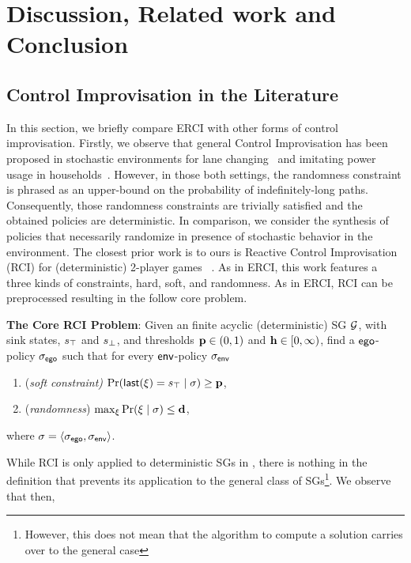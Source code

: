 \section{Discussion, Related work and Conclusion}

\subsection{Control Improvisation in the Literature}

In this section, we briefly compare ERCI with other forms of control
improvisation. Firstly, we observe that general Control Improvisation
has been proposed in stochastic environments for lane
changing~\cite{DBLP:conf/cdc/GeM18} and imitating power usage in
households~\cite{DBLP:conf/iotdi/AkkayaFVDLS16}. However, in those
both settings, the randomness constraint is phrased as an upper-bound
on the probability of indefinitely-long paths. Consequently, those
randomness constraints are trivially satisfied and the obtained
policies are deterministic.  In comparison, we consider the synthesis
of policies that necessarily randomize in presence of stochastic
behavior in the environment. The closest prior work is to ours
is Reactive Control Improvisation (RCI) for (deterministic) 2-player games
~\cite{DBLP:conf/cav/FremontS18}. As in ERCI, this work features
a three kinds of constraints, hard, soft, and randomness. As in ERCI,
RCI can be preprocessed resulting in the follow core problem.
\begin{mdframed}
  \textbf{The Core RCI Problem}: Given an finite acyclic
  (deterministic) SG $\mathcal{G}$, with sink states, $s_{\top}$ and $s_{\bot}$,
  and thresholds $\mathbf{p} \in (0,1)$ and
  $\mathbf{h} \in [0,\infty)$, find a $\mathsf{ego}$-policy ${\sigma_{\mathsf{ego}}}$
  such that for every $\mathsf{env}$-policy ${\sigma_{\mathsf{env}}}$
  \begin{enumerate}
  \item (\emph{soft constraint)}
    $\Pr(\mathsf{last}({\xi}) = s_{\top} \mid \sigma) \geq \mathbf{p}$,
  \item (\emph{randomness})
    $\max_\xi{\Pr(\xi\mid \sigma)} \leq \mathbf{d}$,
   \end{enumerate}
   where $\sigma = \langle {\sigma_{\mathsf{ego}}}, {\sigma_{\mathsf{env}}} \rangle$.
 \end{mdframed}
While RCI is only applied to deterministic SGs in
\cite{DBLP:conf/cav/FremontS18}, there is nothing in the definition
that prevents its application to the general class of
SGs\footnote{However, this does not mean that the algorithm to compute
a solution carries over to the general case}.  We observe that then,
